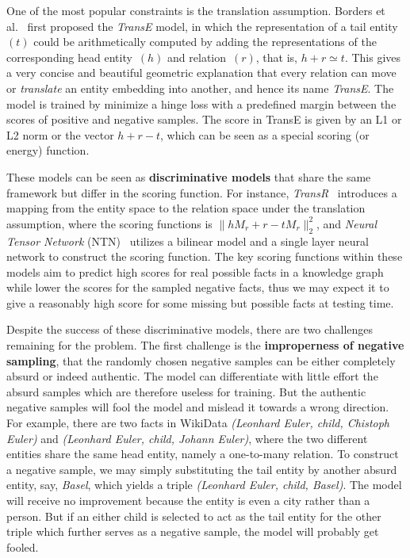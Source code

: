 \documentclass[twocolumn,a4paper,10pt,review,5p]{elsarticle}
\begin{document}

One of the most popular constraints is the translation assumption. Borders et al.~\cite{TransE2013} first proposed the \emph{TransE} model, in which the representation of a tail entity~$(t)$ could be arithmetically computed by adding the representations of the corresponding head entity~$(h)$ and relation~$(r)$, that is, $h + r \simeq t$. This gives a very concise and beautiful geometric explanation that every relation can move or \emph{translate} an entity embedding into another, and hence its name \emph{TransE}.
The model is trained by minimize a hinge loss with a predefined margin between the scores of positive and negative samples. The score in TransE is given by an L1 or L2 norm or the vector $h + r - t$, which can be seen as a special scoring (or energy) function.

These models can be seen as \textbf{discriminative models} that share the same framework but differ in the scoring function. For instance, \emph{TransR}~\cite{TransR2015} introduces a mapping from the entity space to the relation space under the translation assumption, where the scoring functions is $\lVert h M_r + r - t M_r \rVert_2^2 $, and \emph{Neural Tensor Network} (NTN)~\cite{NTN} utilizes a bilinear model and a single layer neural network to construct the scoring function. The key scoring functions within these models aim to predict high scores for real possible facts in a knowledge graph while lower the scores for the sampled negative facts, thus we may expect it to give a reasonably high score for some missing but possible facts at testing time.

Despite the success of these discriminative models, there are two challenges remaining for the problem.
The first challenge is the \textbf{improperness of negative sampling}, that the randomly chosen negative samples can be either completely absurd or indeed authentic.
The model can differentiate with little effort the absurd samples which are therefore useless for training. But the authentic negative samples will fool the model and mislead it towards a wrong direction. For example, there are two facts in WikiData \emph{(Leonhard Euler, child, Chistoph Euler)} and \emph{(Leonhard Euler, child, Johann Euler)}, where the two different entities share the same head entity, namely a one-to-many relation. To construct a negative sample, we may simply substituting the tail entity by another absurd entity, say, \emph{Basel}, which yields a triple \emph{(Leonhard Euler, child, Basel)}. The model will receive no improvement because the entity is even a city rather than a person. But if an either child is selected to act as the tail entity for the other triple which further serves as a negative sample, the model will probably get fooled.
\end{document}
